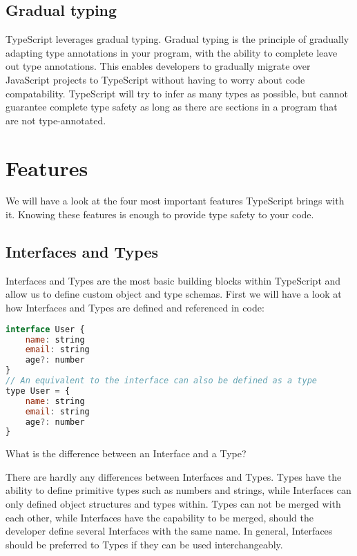 \documentclass[letterpaper,runningheads]{llncs}
\begin{document}
\subsection{Gradual typing}

TypeScript leverages gradual typing. Gradual typing is the principle
of gradually adapting type annotations in your program, with the ability
to complete leave out type annotations. This enables developers to
gradually migrate over JavaScript projects to TypeScript without having
to worry about code compatability. TypeScript will try to infer as
many types as possible, but cannot guarantee complete type safety
as long as there are sections in a program that are not type-annotated.

\section{Features}

We will have a look at the four most important features TypeScript
brings with it. Knowing these features is enough to provide type safety
to your code.

\subsection{Interfaces and Types}

Interfaces and Types are the most basic building blocks within TypeScript
and allow us to define custom object and type schemas. First we will
have a look at how Interfaces and Types are defined and referenced
in code:

\begin{lstlisting}[style=ES6, language=JavaScript, caption="Interface and Type declarations"]
interface User {
	name: string
	email: string
	age?: number
}
// An equivalent to the interface can also be defined as a type
type User = {
	name: string
	email: string
	age?: number
}
\end{lstlisting}

\begin{question}
What is the difference between an Interface and a Type?
\end{question}

\begin{solution}
There are hardly any differences between Interfaces and Types. Types
have the ability to define primitive types such as numbers and strings,
while Interfaces can only defined object structures and types within.
Types can not be merged with each other, while Interfaces have the
capability to be merged, should the developer define several Interfaces
with the same name. In general, Interfaces should be preferred to
Types if they can be used interchangeably.
\end{solution}
\end{document}
